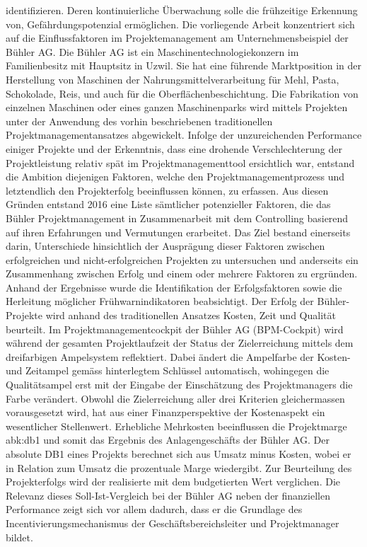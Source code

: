 identifizieren. Deren kontinuierliche Überwachung solle die frühzeitige Erkennung von, Gefährdungspotenzial ermöglichen.
\newline\newline
Die vorliegende Arbeit konzentriert sich auf die Einflussfaktoren im Projektemanagement am Unternehmensbeispiel der Bühler AG. Die Bühler AG ist ein Maschinentechnologiekonzern im Familienbesitz mit Hauptsitz in Uzwil. Sie hat eine führende Marktposition in der Herstellung von Maschinen der Nahrungsmittelverarbeitung für Mehl, Pasta, Schokolade, Reis, und auch für die Oberflächenbeschichtung. Die Fabrikation von einzelnen Maschinen oder eines ganzen Maschinenparks wird mittels Projekten unter der Anwendung des vorhin beschriebenen traditionellen Projektmanagementansatzes abgewickelt. Infolge der unzureichenden Performance einiger Projekte und der Erkenntnis, dass eine drohende Verschlechterung der Projektleistung relativ spät im Projektmanagementtool ersichtlich war, entstand die Ambition diejenigen Faktoren, welche den Projektmanagementprozess und letztendlich den Projekterfolg beeinflussen können, zu erfassen. Aus diesen Gründen entstand 2016 eine Liste sämtlicher potenzieller Faktoren, die das Bühler Projektmanagement in Zusammenarbeit mit dem Controlling basierend auf ihren Erfahrungen und Vermutungen erarbeitet. Das Ziel bestand einerseits darin, Unterschiede hinsichtlich der Ausprägung dieser Faktoren zwischen erfolgreichen und nicht-erfolgreichen Projekten zu untersuchen und anderseits ein Zusammenhang zwischen Erfolg und einem oder mehrere Faktoren zu ergründen. Anhand der Ergebnisse wurde die Identifikation der Erfolgsfaktoren sowie die Herleitung möglicher Frühwarnindikatoren beabsichtigt. Der Erfolg der Bühler-Projekte wird anhand des traditionellen Ansatzes Kosten, Zeit und Qualität beurteilt. Im Projektmanagementcockpit der Bühler AG (BPM-Cockpit) wird während der gesamten Projektlaufzeit der Status der Zielerreichung mittels dem dreifarbigen Ampelsystem reflektiert. Dabei ändert die Ampelfarbe der Kosten- und Zeitampel gemäss hinterlegtem Schlüssel automatisch, wohingegen die Qualitätsampel erst mit der Eingabe der Einschätzung des Projektmanagers die Farbe verändert. Obwohl die Zielerreichung aller drei Kriterien gleichermassen vorausgesetzt wird, hat aus einer Finanzperspektive der Kostenaspekt ein wesentlicher Stellenwert. Erhebliche Mehrkosten beeinflussen die Projektmarge \gls{abk:db1} und somit das Ergebnis des Anlagengeschäfts der Bühler AG. Der absolute DB1 eines Projekts berechnet sich aus Umsatz minus Kosten, wobei er in Relation zum Umsatz die prozentuale Marge wiedergibt. Zur Beurteilung des Projekterfolgs wird der realisierte mit dem budgetierten Wert verglichen. Die Relevanz dieses Soll-Ist-Vergleich bei der Bühler AG neben der finanziellen Performance zeigt sich vor allem dadurch, dass er die Grundlage des Incentivierungsmechanismus der Geschäftsbereichsleiter und Projektmanager bildet. 
